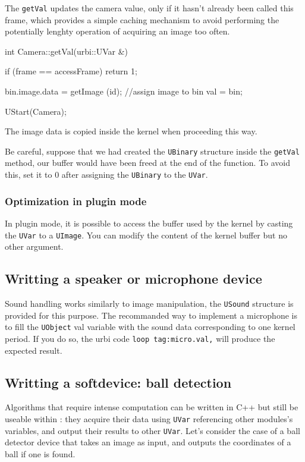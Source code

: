 The \lstinline{getVal} updates the camera value, only if it hasn't
already been called this frame, which provides a simple caching
mechanism to avoid performing the potentially lenghty operation of
acquiring an image too often.

\begin{cxx}
int
Camera::getVal(urbi::UVar &)
{
  if (frame == accessFrame)
    return 1;

  bin.image.data = getImage (id);
  //assign image to bin
  val = bin;
}

UStart(Camera);
\end{cxx}

The image data is copied inside the kernel when proceeding this way.

Be careful, suppose that we had created the \lstinline{UBinary}
structure inside the \lstinline{getVal} method, our buffer would have
been freed at the end of the function. To avoid this, set it to 0
after assigning the \lstinline{UBinary} to the \lstinline{UVar}.

\subsubsection{Optimization in plugin mode}

In plugin mode, it is possible to access the buffer used by the kernel
by casting the \lstinline{UVar} to a \lstinline{UImage}. You can modify the content of the
kernel buffer but no other argument.

\subsection{Writting a speaker or microphone device}

Sound handling works similarly to image manipulation, the
\lstinline{USound} structure is provided for this purpose. The
recommanded way to implement a microphone is to fill the
\lstinline{UObject} val variable with the sound data corresponding to
one kernel period. If you do so, the urbi code \lstinline{loop tag:micro.val,}
will produce the expected result.

\subsection{Writting a softdevice: ball detection}

Algorithms that require intense computation can be written in C++ but
still be useable within \urbi: they acquire their data using
\lstinline{UVar} referencing other modules's variables, and output
their results to other \lstinline{UVar}. Let's consider the case of a
ball detector device that takes an image as input, and outputs the
coordinates of a ball if one is found.

